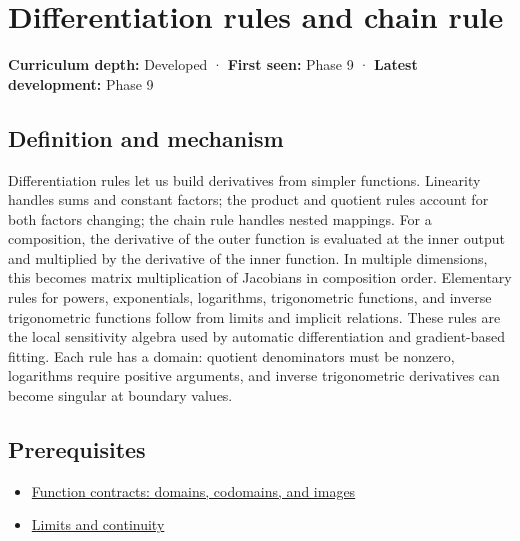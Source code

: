 \hypertarget{appendix-d9f70bdfbc92}{}\label{referencestart:appendix-d9f70bdfbc92}
\section{Differentiation rules and chain rule}\label{appendix-d9f70bdfbc92-differentiation-rules-and-chain-rule}

\textbf{Curriculum depth:} Developed · \textbf{First seen:} Phase 9 · \textbf{Latest development:} Phase 9

\begin{allmightroledefinition}

\subsection{Definition and mechanism}\label{appendix-d9f70bdfbc92-definition-and-mechanism}

Differentiation rules let us build derivatives from simpler functions. Linearity handles sums and constant factors; the product and quotient rules account for both factors changing; the chain rule handles nested mappings. For a composition, the derivative of the outer function is evaluated at the inner output and multiplied by the derivative of the inner function. In multiple dimensions, this becomes matrix multiplication of Jacobians in composition order. Elementary rules for powers, exponentials, logarithms, trigonometric functions, and inverse trigonometric functions follow from limits and implicit relations. These rules are the local sensitivity algebra used by automatic differentiation and gradient-based fitting. Each rule has a domain: quotient denominators must be nonzero, logarithms require positive arguments, and inverse trigonometric derivatives can become singular at boundary values.

\end{allmightroledefinition}

\subsection{Prerequisites}\label{appendix-d9f70bdfbc92-prerequisites}

\begin{itemize}
\tightlist
\item
  \hyperref[appendix-a59658325cd6]{Function contracts: domains, codomains, and images}
\item
  \hyperref[appendix-fecc1847f5a3]{Limits and continuity}
\end{itemize}

